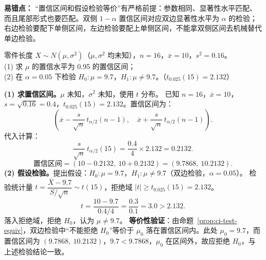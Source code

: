 ﻿\documentclass[lang=cn,11pt]{elegantbook}
\begin{document}
\begin{note}
\textbf{易错点：} “置信区间和假设检验等价”有严格前提：参数相同、显著性水平匹配、而且尾部形式也要匹配。双侧 \(1-\alpha\) 置信区间对应双边显著性水平为 \(\alpha\) 的检验；右边检验要配下单侧区间，左边检验要配上单侧区间，不能拿双侧区间去机械替代单边检验。
\end{note}

\begin{exercise}\label{exer:9-ci-test}
零件长度 \(X \sim N(\mu, \sigma^2)\)（\(\mu, \sigma^2\) 均未知），\(n=16\)，\(\overline{x}=10\)，\(s^2=0.16\)。\\
(1) 求 \(\mu\) 的置信水平为 0.95 的置信区间；\\
(2) 在 \(\alpha=0.05\) 下检验 \(H_0\colon \mu=9.7\)，\(H_1\colon \mu\neq9.7\)。（\(t_{0.025}(15)=2.132\)）
\end{exercise}
\begin{solution}
\textbf{(1) 求置信区间。}\(\mu\) 未知，\(\sigma^2\) 未知，使用 \(t\) 分布。
已知 \(n=16\)，\(\overline{x}=10\)，\(s=\sqrt{0.16}=0.4\)，\(t_{0.025}(15)=2.132\)。置信区间为：
\[
\left(\overline{x} - \frac{s}{\sqrt{n}}\,t_{\alpha/2}(n{-}1),\quad \overline{x} + \frac{s}{\sqrt{n}}\,t_{\alpha/2}(n{-}1)\right).
\]
代入计算：
\[
\frac{s}{\sqrt{n}}\,t_{\alpha/2}(15) = \frac{0.4}{4}\times2.132 = 0.2132.
\]
\[
\text{置信区间} = (10-0.2132,\ 10+0.2132) = (9.7868,\ 10.2132).
\]
\textbf{(2) 假设检验。}提出假设：\(H_0\colon \mu=9.7\)，\(H_1\colon \mu\neq9.7\)（双边检验，\(\alpha=0.05\)）。
检验统计量 \(t = \dfrac{\overline{X}-9.7}{S/\sqrt{n}} \sim t(15)\)，拒绝域 \(|t| \geq t_{0.025}(15)=2.132\)。
\[
t = \frac{10-9.7}{0.4/4} = \frac{0.3}{0.1} = 3.0 > 2.132.
\]
落入拒绝域，拒绝 \(H_0\)，认为 \(\mu\neq9.7\)。
\textbf{等价性验证}：由命题~\ref{prop:ci-test-equiv}，双边检验中“不能拒绝 \(H_0\)”等价于 \(\mu_0\) 落在置信区间内。此处 \(\mu_0=9.7\)，而置信区间为 \((9.7868,\ 10.2132)\)，\(9.7 < 9.7868\)，\(\mu_0\) 在区间外，故应拒绝 \(H_0\)，与上述检验结论一致。
\end{solution}
\end{document}
